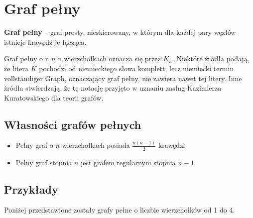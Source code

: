 \documentclass[10pt,a4paper,onecolumn]{article}
\begin{document}
\section{Graf pełny\cite{graf}}
\textbf{Graf pełny} – graf prosty, nieskierowany, w którym dla każdej pary węzłów istnieje krawędź je łącząca.

Graf pełny o n $n$ n wierzchołkach oznacza się przez $K_n$. Niektóre źródła podają, że litera $K$ pochodzi od niemieckiego słowa komplett, lecz niemiecki termin vollständiger Graph, oznaczający graf pełny, nie zawiera nawet tej litery. Inne źródła stwierdzają, że tę notację przyjęto w uznaniu zasług Kazimierza Kuratowskiego dla teorii grafów.

\subsection{Własności grafów pełnych}
\begin{itemize}
\item Pełny graf o $n$ wierzchołkach posiada $\frac{n(n-1)}{2}$ krawędzi
\item Pełny graf stopnia $n$ jest grafem regularnym stopnia $n-1$
\end{itemize}
\subsection{Przykłady} 
Poniżej przedstawione zostały grafy pełne o liczbie wierzchołków od 1 do 4.
\vspace*{25px} 
\begin{center}


\vspace*{25px}
\end{center}

\begin{center}
\vspace*{25px}
\end{center}
\end{document}
